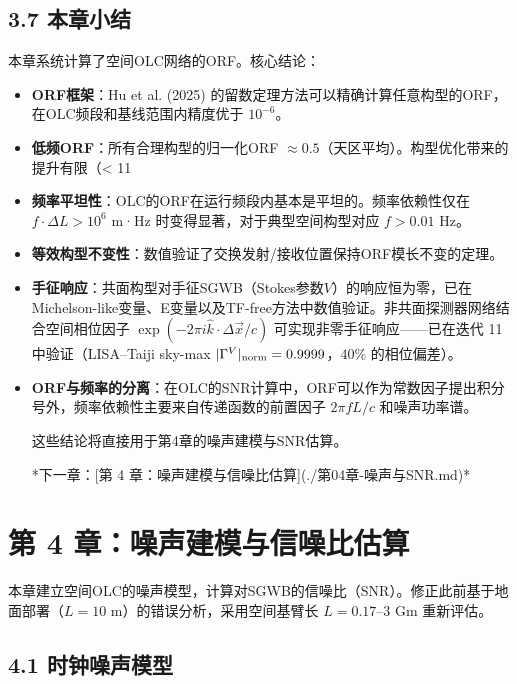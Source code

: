 \documentclass[12pt,a4paper]{article}
\begin{document}
\subsection{3.7 本章小结}


本章系统计算了空间OLC网络的ORF。核心结论：

\begin{itemize}
  \item[1] \textbf{ORF框架}：Hu et al. (2025) 的留数定理方法可以精确计算任意构型的ORF，在OLC频段和基线范围内精度优于 $10^{-6}$。

  \item[2] \textbf{低频ORF}：所有合理构型的归一化ORF $\approx 0.5$（天区平均）。构型优化带来的提升有限（< 11%

  \item[3] \textbf{频率平坦性}：OLC的ORF在运行频段内基本是平坦的。频率依赖性仅在 $f \cdot \Delta L > 10^6$ m·Hz 时变得显著，对于典型空间构型对应 $f > 0.01$ Hz。

  \item[4] \textbf{等效构型不变性}：数值验证了交换发射/接收位置保持ORF模长不变的定理。

  \item[5] \textbf{手征响应}：共面构型对手征SGWB（Stokes参数$V$）的响应恒为零，已在Michelson-like变量、E变量以及TF-free方法中数值验证。非共面探测器网络结合空间相位因子 $\exp(-2\pi i \hat{k} \cdot \Delta\vec{x}/c)$ 可实现非零手征响应——已在迭代 11 中验证（LISA--Taiji sky-max $|\Gamma^V|_{\rm norm} = 0.9999$，$40\%$ 的相位偏差）。

  \item[6] \textbf{ORF与频率的分离}：在OLC的SNR计算中，ORF可以作为常数因子提出积分号外，频率依赖性主要来自传递函数的前置因子 $2\pi f L/c$ 和噪声功率谱。

这些结论将直接用于第4章的噪声建模与SNR估算。


*下一章：[第 4 章：噪声建模与信噪比估算](./第04章-噪声与SNR.md)*

\end{itemize}
\section{第 4 章：噪声建模与信噪比估算}


本章建立空间OLC的噪声模型，计算对SGWB的信噪比（SNR）。修正此前基于地面部署（$L = 10$ m）的错误分析，采用空间基臂长 $L = 0.17$–3 Gm 重新评估。

\subsection{4.1 时钟噪声模型}
\end{document}
